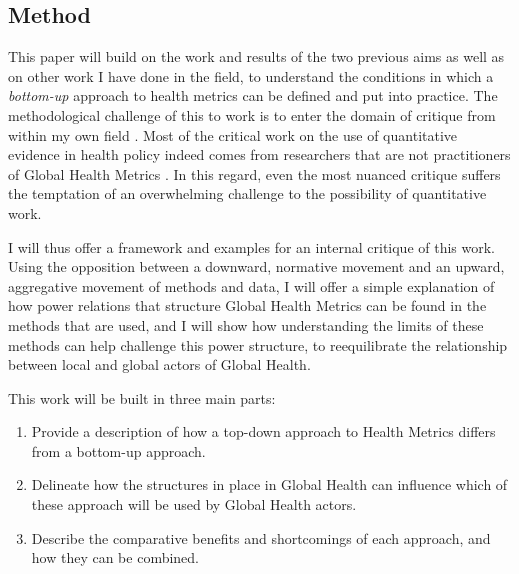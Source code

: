 

\subsection{Method}

This paper will build on the work and results of the two previous aims as well as on other work I have done in the field, to understand the conditions in which a \textsl{bottom-up} approach to health metrics can be defined and put into practice. The methodological challenge of this to work is to enter the domain of critique from within my own field \citep{latour_why_2004}. Most of the critical work on the use of quantitative evidence in health policy indeed comes from researchers that are not practitioners of Global Health Metrics \citep{merry_measuring_2011} . In this regard, even the most nuanced critique suffers the temptation of an overwhelming challenge to the possibility of quantitative work\citep{latour_why_2004}.

I will thus offer a framework and examples for an internal critique of this work. Using the opposition between a downward, normative movement and an upward, aggregative movement of methods and data, I will offer a simple explanation of how power relations that structure Global Health Metrics can be found in the methods that are used, and I will show how understanding the limits of these methods can help challenge this power structure, to reequilibrate the relationship between local and global actors of Global Health.

This work will be built in three main parts:

\begin{enumerate}
\item Provide a description of how a top-down approach to Health Metrics differs from a bottom-up approach.
\item Delineate how the structures in place in Global Health can influence which of these approach will be used by Global Health actors.
\item Describe the comparative benefits and shortcomings of each approach, and how they can be combined.
\end{enumerate}

